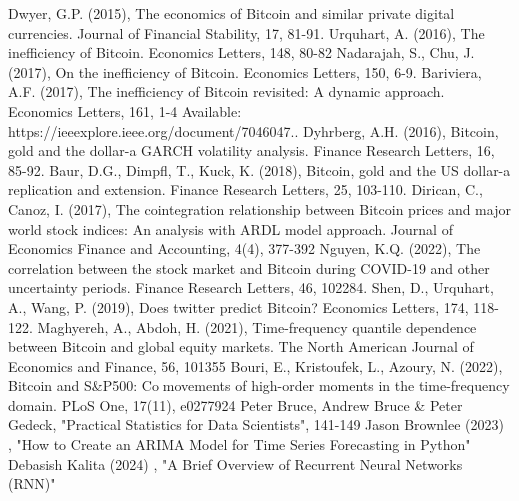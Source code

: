 \documentclass{ieeeojies}
\begin{document}
\begin{thebibliography}{00}
 Dwyer, G.P. (2015), The economics of Bitcoin and similar private digital currencies. Journal of Financial Stability, 17, 81-91.
 Urquhart, A. (2016), The inefficiency of Bitcoin. Economics Letters, 148, 80-82
 Nadarajah, S., Chu, J. (2017), On the inefficiency of Bitcoin. Economics Letters, 150, 6-9.
 Bariviera, A.F. (2017), The inefficiency of Bitcoin revisited: A dynamic approach. Economics Letters, 161, 1-4 Available: https://ieeexplore.ieee.org/document/7046047..
 Dyhrberg, A.H. (2016), Bitcoin, gold and the dollar-a GARCH volatility analysis. Finance Research Letters, 16, 85-92.
 Baur, D.G., Dimpfl, T., Kuck, K. (2018), Bitcoin, gold and the US dollar-a replication and extension. Finance Research Letters, 25, 103-110.
 Dirican, C., Canoz, I. (2017), The cointegration relationship between Bitcoin prices and major world stock indices: An analysis with ARDL 
model approach. Journal of Economics Finance and Accounting, 
4(4), 377-392
  Nguyen, K.Q. (2022), The correlation between the stock market and Bitcoin during COVID-19 and other uncertainty periods. Finance 
Research Letters, 46, 102284.
 Shen, D., Urquhart, A., Wang, P. (2019), Does twitter predict Bitcoin? Economics Letters, 174, 118-122.
 Maghyereh, A., Abdoh, H. (2021), Time-frequency quantile dependence between Bitcoin and global equity markets. The North American Journal of Economics and Finance, 56, 101355
 Bouri, E., Kristoufek, L., Azoury, N. (2022), Bitcoin and S&P500: Comovements of high-order moments in the time-frequency domain. PLoS One, 17(11), e0277924
 Peter Bruce, Andrew Bruce & Peter Gedeck, "Practical Statistics for Data Scientists", 141-149
 Jason Brownlee (2023) , "How to Create an ARIMA Model for Time Series Forecasting in Python"
 Debasish Kalita (2024) , "A Brief Overview of Recurrent Neural Networks (RNN)"

\end{thebibliography}


\EOD
\end{document}

